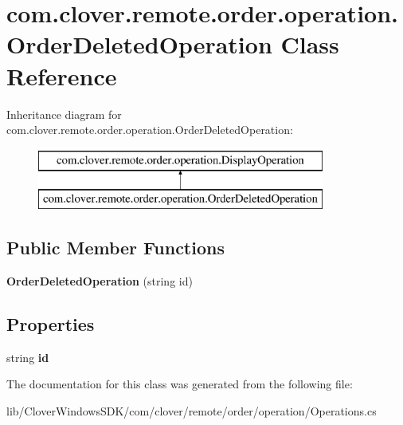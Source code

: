 \hypertarget{classcom_1_1clover_1_1remote_1_1order_1_1operation_1_1_order_deleted_operation}{}\section{com.\+clover.\+remote.\+order.\+operation.\+Order\+Deleted\+Operation Class Reference}
\label{classcom_1_1clover_1_1remote_1_1order_1_1operation_1_1_order_deleted_operation}
Inheritance diagram for com.\+clover.\+remote.\+order.\+operation.\+Order\+Deleted\+Operation\+:\begin{figure}[H]
\begin{center}
\leavevmode
\includegraphics[height=2.000000cm]{classcom_1_1clover_1_1remote_1_1order_1_1operation_1_1_order_deleted_operation}
\end{center}
\end{figure}
\subsection*{Public Member Functions}
\begin{DoxyCompactItemize}
\item 
\mbox{\label{classcom_1_1clover_1_1remote_1_1order_1_1operation_1_1_order_deleted_operation_a5fb7913eb5201fdbe0d43fd4f72d2f57}} 
{\bfseries Order\+Deleted\+Operation} (string id)
\end{DoxyCompactItemize}
\subsection*{Properties}
\begin{DoxyCompactItemize}
\item 
\mbox{\label{classcom_1_1clover_1_1remote_1_1order_1_1operation_1_1_order_deleted_operation_a9a68575627e956f9593dbf0e0171a3ae}} 
string {\bfseries id}
\end{DoxyCompactItemize}


The documentation for this class was generated from the following file\+:\begin{DoxyCompactItemize}
\item 
lib/\+Clover\+Windows\+S\+D\+K/com/clover/remote/order/operation/Operations.\+cs\end{DoxyCompactItemize}
